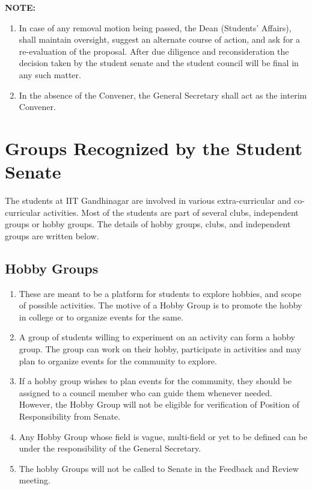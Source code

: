 \documentclass[12pt]{article}
\begin{document}
\noindent \textbf{NOTE:} \begin{enumerate}
    \item In case of any removal motion being passed, the Dean (Students’ Affairs), shall maintain oversight, suggest an alternate course of action, and ask for a re-evaluation of the proposal. After due diligence and reconsideration the decision taken by the student senate and the student council will be final in any such matter.
    \item In the absence of the Convener, the General Secretary shall act as the interim Convener.
\end{enumerate} 


\section{Groups Recognized by the Student Senate}
The students at IIT Gandhinagar are involved in various extra-curricular and co-curricular activities. Most of the students are part of several clubs, independent groups or hobby groups. The details of hobby groups, clubs, and independent groups are written below.

\subsection{Hobby Groups}
\begin{enumerate}
    \item These are meant to be a platform for students to explore hobbies, and scope of possible activities. The motive of a Hobby Group is to promote the hobby in college or to organize events for the same.
    \item A group of students willing to experiment on an activity can form a hobby group. The group can work on their hobby, participate in activities and may plan to organize events for the community to explore.
    \item If a hobby group wishes to plan events for the community, they should be assigned to a council member who can guide them whenever needed. However, the Hobby Group will not be eligible for verification of Position of Responsibility from Senate.
    \item Any Hobby Group whose field is vague, multi-field or yet to be defined can be under the responsibility of the General Secretary.
    \item The hobby Groups will not be called to Senate in the Feedback and Review meeting.
\end{enumerate}
\end{document}
